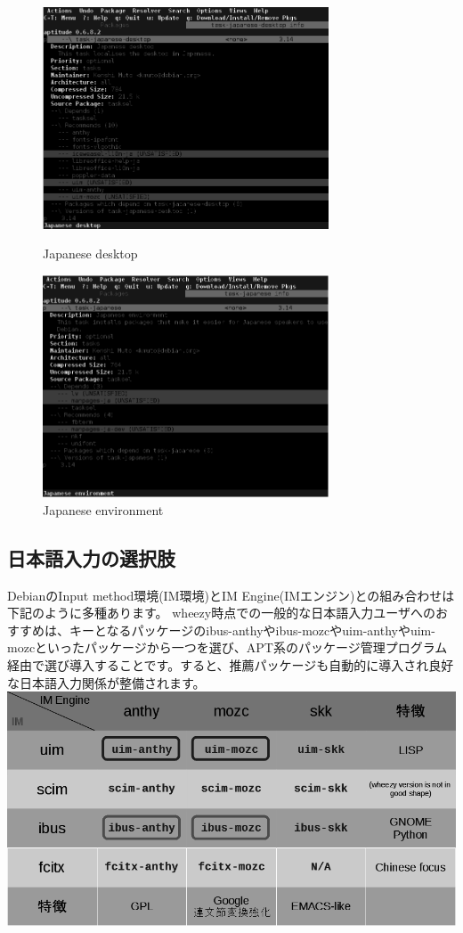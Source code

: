 \documentclass[mingoth,a4paper]{jsarticle}
\begin{document}
\begin{figure}[htbp]
 \begin{minipage}{0.5\hsize}
  \begin{center}
   \includegraphics[width=8.5cm]{image201212/im01_mono.png}
  \end{center}
  \caption{Japanese desktop}
  \label{fig:one}
 \end{minipage}
 \begin{minipage}{0.5\hsize}
  \begin{center}
   \includegraphics[width=8.5cm]{image201212/im02_mono.png}
  \end{center}
  \caption{Japanese environment}
  \label{fig:two}
 \end{minipage}
\end{figure}

\clearpage
\subsection{日本語入力の選択肢}
DebianのInput method環境(IM環境)とIM Engine(IMエンジン)との組み合わせは下記のように多種あります。
wheezy時点での一般的な日本語入力ユーザへのおすすめは、キーとなるパッケージのibus-anthyやibus-mozcやuim-anthyやuim-mozcといったパッケージから一つを選び、APT系のパッケージ管理プログラム経由で選び導入することです。すると、推薦パッケージも自動的に導入され良好な日本語入力関係が整備されます。
\includegraphics[width=0.7\hsize]{image201212/im03_mono.png}
\end{document}
